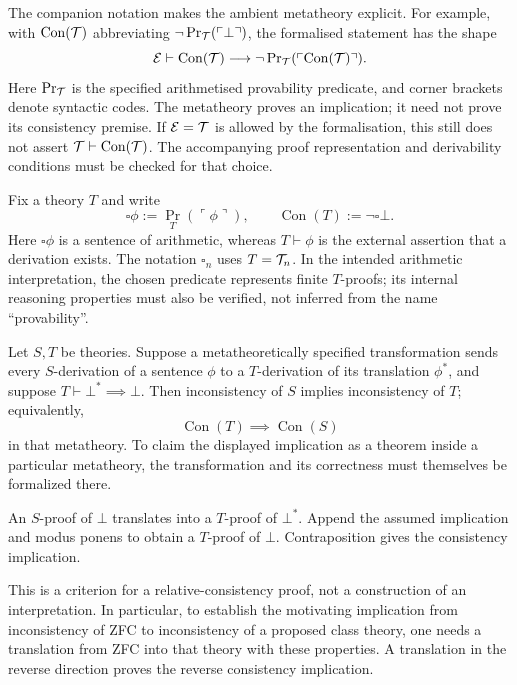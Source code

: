 \begin{note}
The companion notation makes the ambient metatheory explicit. For example,
with $\operatorname{Con}(\mathcal{T})$ abbreviating
$\neg\operatorname{Pr}_{\mathcal{T}}(\ulcorner\bot\urcorner)$, the formalised statement
has the shape
\[
\mathcal{E}\vdash
\operatorname{Con}(\mathcal{T})\longrightarrow
\neg\operatorname{Pr}_{\mathcal{T}}(\ulcorner\operatorname{Con}(\mathcal{T})\urcorner).
\]
Here $\operatorname{Pr}_{\mathcal{T}}$ is the specified arithmetised provability
predicate, and corner brackets denote syntactic codes. The metatheory proves
an implication; it need not prove its consistency premise. If
$\mathcal{E}=\mathcal{T}$ is allowed by the formalisation, this still does not assert
$\mathcal{T}\vdash\operatorname{Con}(\mathcal{T})$. The accompanying proof representation
and derivability conditions must be checked for that choice.
\end{note}

\begin{definition}
Fix a theory $T$ and write
\[
\square\phi:=\operatorname{Pr}_T(\ulcorner\phi\urcorner),
\qquad \operatorname{Con}(T):=\neg\square\bot.
\]
Here $\square\phi$ is a sentence of arithmetic, whereas $T\vdash\phi$
is the external assertion that a derivation exists. The notation
$\square_n$ uses $T=\mathcal{T}_n$. In the intended arithmetic interpretation,
the chosen predicate represents finite $T$-proofs; its internal reasoning
properties must also be verified, not inferred from the name ``provability''.
\end{definition}

\begin{proposition}
Let $S,T$ be theories. Suppose a metatheoretically specified transformation
sends every $S$-derivation of a sentence $\phi$ to a $T$-derivation of
its translation $\phi^*$, and suppose $T\vdash\bot^*\implies\bot$.
Then inconsistency of $S$ implies inconsistency of $T$; equivalently,
\[
\operatorname{Con}(T)\implies\operatorname{Con}(S)
\]
in that metatheory. To claim the displayed implication as a theorem
inside a particular metatheory, the transformation and its correctness
must themselves be formalized there.
\end{proposition}
\Proof
An $S$-proof of $\bot$ translates into a $T$-proof of $\bot^*$.
Append the assumed implication and modus ponens to obtain a $T$-proof
of $\bot$. Contraposition gives the consistency implication.
\Done

This is a criterion for a relative-consistency proof, not a construction
of an interpretation. In particular, to establish the motivating
implication from inconsistency of ZFC to inconsistency of a proposed
class theory, one needs a translation from ZFC into that theory with
these properties. A translation in the reverse direction proves the
reverse consistency implication.

